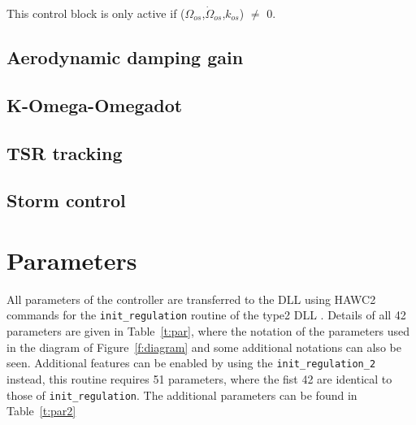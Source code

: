 This control block is only active if ($\Omega_{os}$,$\dot{\Omega}_{os}$,$k_{os}$) $\neq$ 0.

\subsection{Aerodynamic damping gain}
\subsection{K-Omega-Omegadot}
\subsection{TSR tracking}
\subsection{Storm control}

\section{Parameters}\label{s:par}

All parameters of the controller are transferred to the DLL using HAWC2 commands for the \verb|init_regulation| routine of the type2 DLL \cite{Larsen12}. Details of all 42 parameters are given in Table~\ref{t:par}, where the notation of the parameters used in the diagram of Figure~\ref{f:diagram} and some additional notations can also be seen. Additional features can be enabled by using the \verb|init_regulation_2| instead, this routine requires 51 parameters, where the fist 42 are identical to those of \verb|init_regulation|. The additional parameters can be found in Table~\ref{t:par2}

